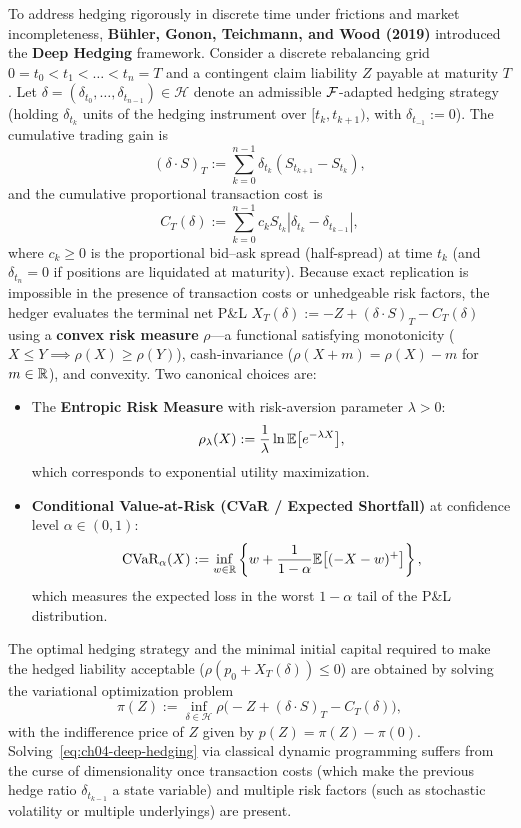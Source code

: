 To address hedging rigorously in discrete time under frictions and market incompleteness, \textbf{B\"uhler, Gonon, Teichmann, and Wood (2019)} introduced the \textbf{Deep Hedging} framework. Consider a discrete rebalancing grid $0 = t_0 < t_1 < \dots < t_n = T$ and a contingent claim liability $Z$ payable at maturity $T$. Let $\delta = (\delta_{t_0}, \dots, \delta_{t_{n-1}}) \in \mathcal{H}$ denote an admissible $\mathcal{F}$-adapted hedging strategy (holding $\delta_{t_k}$ units of the hedging instrument over $[t_k, t_{k+1})$, with $\delta_{t_{-1}} := 0$). The cumulative trading gain is
\[
    (\delta \cdot S)_T := \sum_{k=0}^{n-1} \delta_{t_k}(S_{t_{k+1}} - S_{t_k}),
\]
and the cumulative proportional transaction cost is
\begin{equation}
    \label{eq:ch04-tx-cost}
    C_T(\delta) := \sum_{k=0}^{n-1} c_k S_{t_k} |\delta_{t_k} - \delta_{t_{k-1}}|,
\end{equation}
where $c_k \ge 0$ is the proportional bid--ask spread (half-spread) at time $t_k$ (and $\delta_{t_n} = 0$ if positions are liquidated at maturity). Because exact replication is impossible in the presence of transaction costs or unhedgeable risk factors, the hedger evaluates the terminal net P\&L $X_T(\delta) := -Z + (\delta \cdot S)_T - C_T(\delta)$ using a \textbf{convex risk measure} $\rho$---a functional satisfying monotonicity ($X \le Y \implies \rho(X) \ge \rho(Y)$), cash-invariance ($\rho(X + m) = \rho(X) - m$ for $m \in \mathbb{R}$), and convexity. Two canonical choices are:
\begin{itemize}
    \item The \textbf{Entropic Risk Measure} with risk-aversion parameter $\lambda > 0$:
    \[
        \rho_\lambda(X) := \frac{1}{\lambda}\ln \mathbb{E}\bigl[e^{-\lambda X}\bigr],
    \]
    which corresponds to exponential utility maximization.
    \item \textbf{Conditional Value-at-Risk (CVaR / Expected Shortfall)} at confidence level $\alpha \in (0, 1)$:
    \[
        \operatorname{CVaR}_\alpha(X) := \inf_{w \in \mathbb{R}}\left\{w + \frac{1}{1 - \alpha}\mathbb{E}\bigl[(-X - w)^+\bigr]\right\},
    \]
    which measures the expected loss in the worst $1 - \alpha$ tail of the P\&L distribution.
\end{itemize}

The optimal hedging strategy and the minimal initial capital required to make the hedged liability acceptable ($\rho(p_0 + X_T(\delta)) \le 0$) are obtained by solving the variational optimization problem
\begin{equation}
    \label{eq:ch04-deep-hedging}
    \pi(Z) := \inf_{\delta \in \mathcal{H}} \rho\bigl(-Z + (\delta \cdot S)_T - C_T(\delta)\bigr),
\end{equation}
with the indifference price of $Z$ given by $p(Z) = \pi(Z) - \pi(0)$. Solving~\eqref{eq:ch04-deep-hedging} via classical dynamic programming suffers from the curse of dimensionality once transaction costs (which make the previous hedge ratio $\delta_{t_{k-1}}$ a state variable) and multiple risk factors (such as stochastic volatility or multiple underlyings) are present.

